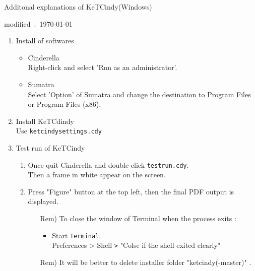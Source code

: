 \documentclass{article}
\begin{document}
\begin{center}
Additonal explanations of KeTCindy(Windows)
\end{center}

\hfill modified\ :\ \today

\begin{enumerate}[\bf\large 1.]
\item Install of softwares

\begin{itemize}
\item Cinderella\\
\hspace*{5mm}Right-click and select 'Run as an administrator'.
\item Sumatra\\
\hspace*{5mm}Select 'Option' of Sumatra and change the destination to Program Files or Program Files (x86).
 \end{itemize}


\item Install KeTCdindy\\
\hspace*{5mm}Use \verb|ketcindysettings.cdy|

\item Test run of KeTCindy
 \begin{enumerate}[(1)]
  \item Once quit Cinderella and double-click \verb|testrun.cdy|.\\
  \hspace*{10mm}Then a frame in white appear on the screen.  
  \item Press "Figure" button at the top left, then the final PDF output is displayed. 
    \begin{itemize}
    \item[Rem)]To close the window of Terminal when the process exits :
      \begin{itemize}
      \item Start \verb|Terminal|.\\
      \hspace*{10mm}Preferences > Shell \verb|>| "Colse if the shell exited clearly"
      \end{itemize}
    \item[Rem)]It will be better to delete installer folder "ketcindy(-master)" .
    \end{itemize} 
  \end{enumerate}


\end{enumerate}
\end{document}
